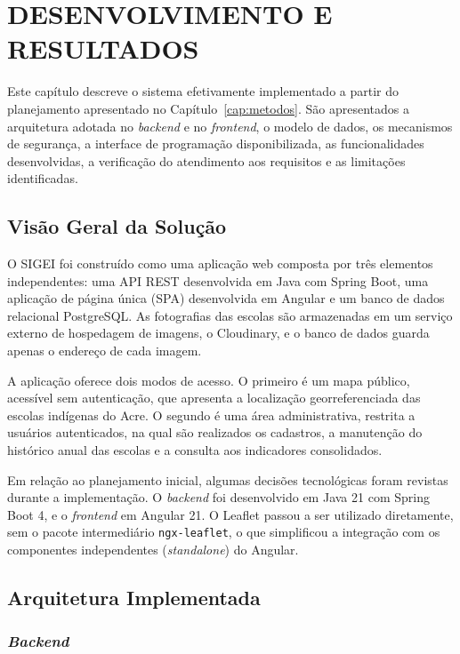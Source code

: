 
\chapter{DESENVOLVIMENTO E RESULTADOS}
\label{cap:desenvolvimento}

Este capítulo descreve o sistema efetivamente implementado a partir do planejamento apresentado no Capítulo~\ref{cap:metodos}. São apresentados a arquitetura adotada no \textit{backend} e no \textit{frontend}, o modelo de dados, os mecanismos de segurança, a interface de programação disponibilizada, as funcionalidades desenvolvidas, a verificação do atendimento aos requisitos e as limitações identificadas.

\section{Visão Geral da Solução}

O SIGEI foi construído como uma aplicação web composta por três elementos independentes: uma API REST desenvolvida em Java com Spring Boot, uma aplicação de página única (SPA) desenvolvida em Angular e um banco de dados relacional PostgreSQL. As fotografias das escolas são armazenadas em um serviço externo de hospedagem de imagens, o Cloudinary, e o banco de dados guarda apenas o endereço de cada imagem.

A aplicação oferece dois modos de acesso. O primeiro é um mapa público, acessível sem autenticação, que apresenta a localização georreferenciada das escolas indígenas do Acre. O segundo é uma área administrativa, restrita a usuários autenticados, na qual são realizados os cadastros, a manutenção do histórico anual das escolas e a consulta aos indicadores consolidados.

Em relação ao planejamento inicial, algumas decisões tecnológicas foram revistas durante a implementação. O \textit{backend} foi desenvolvido em Java 21 com Spring Boot 4, e o \textit{frontend} em Angular 21. O Leaflet passou a ser utilizado diretamente, sem o pacote intermediário \texttt{ngx-leaflet}, o que simplificou a integração com os componentes independentes (\textit{standalone}) do Angular.

\section{Arquitetura Implementada}

\subsection{\textit{Backend}}

